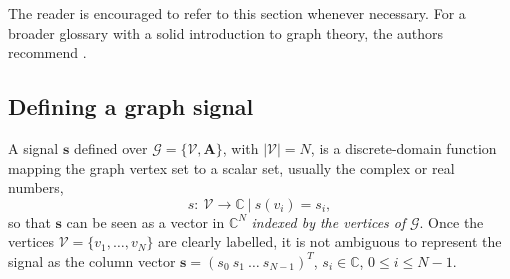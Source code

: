 The reader is encouraged to refer to this section whenever necessary. For a broader glossary with a solid introduction to graph theory, the authors recommend \cite{bondy2008graph,chung1997spectral}.


\subsection{Defining a graph signal}

A signal $ \mathbf{s} $ defined over $ \mathcal{G} = \{\mathcal{V}, \mathbf{A}\} $, with $ |\mathcal{V}| = N $, is a discrete-domain function mapping the graph vertex set to a scalar set, usually the complex or real numbers,
\begin{equation}
	s: \ \mathcal{V} \rightarrow \mathbb{C} \ | \ s(v_i) = s_i,
\end{equation}
so that $ \mathbf{s} $ can be seen as a vector in $ \mathbb{C}^N $ \emph{indexed by the vertices of} $ \mathcal{G} $. Once the vertices $ \mathcal{V} = \{v_1, \dots, v_N\}$ are clearly labelled, it is not ambiguous to represent the signal as the column vector $ \mathbf{s} = (s_0 \ s_1 \ \dots \ s_{N-1})^T$, $ s_i \in \mathbb{C} $, $ 0 \leq i \leq N-1 $.

